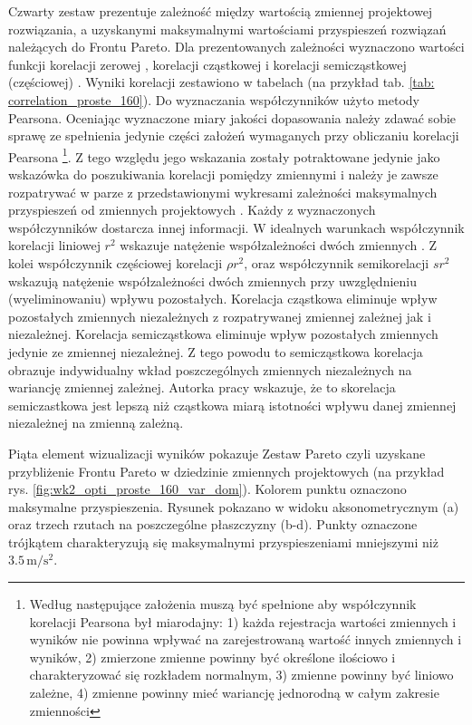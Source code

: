 Czwarty zestaw prezentuje zależność między wartością zmiennej projektowej rozwiązania, a uzyskanymi maksymalnymi wartościami przyspieszeń rozwiązań należących do Frontu Pareto. Dla prezentowanych zależności wyznaczono wartości funkcji korelacji zerowej , korelacji cząstkowej  i korelacji semicząstkowej (częściowej)  \parencite{Tabachnick}. Wyniki korelacji zestawiono w tabelach (na przykład tab. \ref{tab: correlation_proste_160}). Do wyznaczania współczynników użyto metody Pearsona. Oceniając wyznaczone miary jakości dopasowania należy zdawać sobie sprawę ze spełnienia jedynie części założeń wymaganych przy obliczaniu korelacji Pearsona
\footnote{
	Według \cite{Warner2012} następujące założenia muszą być spełnione aby współczynnik korelacji Pearsona był miarodajny: 1) każda rejestracja wartości zmiennych i wyników nie powinna wpływać na zarejestrowaną wartość innych zmiennych i wyników, 2) zmierzone zmienne powinny być określone ilościowo i charakteryzować się rozkładem normalnym, 3) zmienne powinny być liniowo zależne, 4) zmienne powinny mieć wariancję jednorodną w całym zakresie zmienności}.
Z tego względu jego wskazania zostały potraktowane jedynie jako wskazówka do poszukiwania korelacji pomiędzy zmiennymi i należy je zawsze rozpatrywać w parze z przedstawionymi wykresami zależności maksymalnych przyspieszeń od zmiennych projektowych \parencite{Vargha2013}. Każdy z wyznaczonych współczynników dostarcza innej informacji. W idealnych warunkach współczynnik korelacji liniowej $r^2$ wskazuje natężenie współzależności dwóch zmiennych \parencite{Czaja2000}. Z kolei współczynnik częściowej korelacji $\rho r^2$, oraz współczynnik semikorelacji $sr^2$ wskazują natężenie współzależności dwóch zmiennych przy uwzględnieniu (wyeliminowaniu) wpływu pozostałych. Korelacja cząstkowa eliminuje wpływ pozostałych zmiennych niezależnych z rozpatrywanej zmiennej zależnej jak i niezależnej. Korelacja semicząstkowa eliminuje wpływ pozostałych zmiennych jedynie ze zmiennej niezależnej. Z tego powodu to semicząstkowa korelacja obrazuje indywidualny wkład poszczególnych zmiennych niezależnych na wariancję zmiennej zależnej. Autorka pracy \cite{Tabachnick} wskazuje, że to skorelacja semiczastkowa jest lepszą niż cząstkowa miarą istotności wpływu danej zmiennej niezależnej na zmienną zależną.

Piąta element wizualizacji wyników pokazuje Zestaw Pareto czyli uzyskane przybliżenie Frontu Pareto w dziedzinie zmiennych projektowych (na przykład rys. \ref{fig:wk2_opti_proste_160_var_dom}). Kolorem punktu oznaczono maksymalne przyspieszenia. Rysunek pokazano w widoku aksonometrycznym (a) oraz trzech rzutach na poszczególne płaszczyzny (b-d). Punkty oznaczone trójkątem charakteryzują się maksymalnymi przyspieszeniami mniejszymi niż $3.5\,\mathrm{m/s^2}$.

